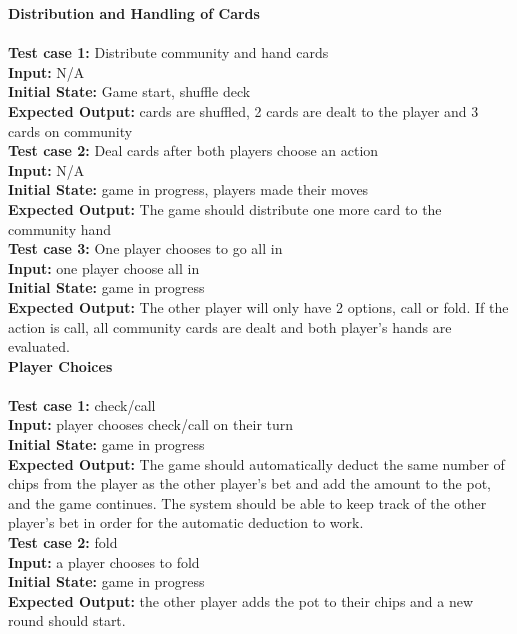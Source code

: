 \documentclass[12pt]{article}
\begin{document}
    \noindent \textbf{Distribution and Handling of Cards}\\
    \\
    \textbf{Test case 1:} Distribute community and hand cards\\
    \textbf{Input:} N/A\\
	\textbf{Initial State:} Game start, shuffle deck\\
	\textbf{Expected Output:} cards are shuffled, 2 cards are dealt to the player and 3 cards on community\\

   	\noindent \textbf{ Test case 2:} Deal cards after both players choose an action\\
    \textbf{Input:} N/A\\
    \textbf{Initial State:} game in progress, players made their moves\\
    \textbf{Expected Output:} The game should distribute one more card to the community hand\\

    \noindent \textbf{Test case 3:} One player chooses to go all in \\
    \textbf{Input:} one player choose all in\\
    \textbf{Initial State:} game in progress\\
    \textbf{Expected Output:} The other player will only have 2 options, call or fold. If the action is  
call, all community cards are dealt and both player’s hands are evaluated.  \\

    \noindent \textbf{Player Choices }\\
    \\
    \textbf{Test case 1:} check/call\\ 
    \textbf{Input:} player chooses check/call on their turn\\
    \textbf{Initial State:} game in progress\\
	\textbf{Expected Output: }The game should automatically deduct the same number of chips from the player as the other player’s bet and add the amount to the pot, and the game continues. The system should be able to keep track of the other player’s bet in order for the automatic deduction to work. \\

	 \noindent \textbf{Test case 2:} fold\\
	\textbf{Input:} a player chooses to fold\\
	\textbf{Initial State:} game in progress\\
	\textbf{Expected Output:} the other player adds the pot to their chips and a new round should start.\\
 
\end{document}
